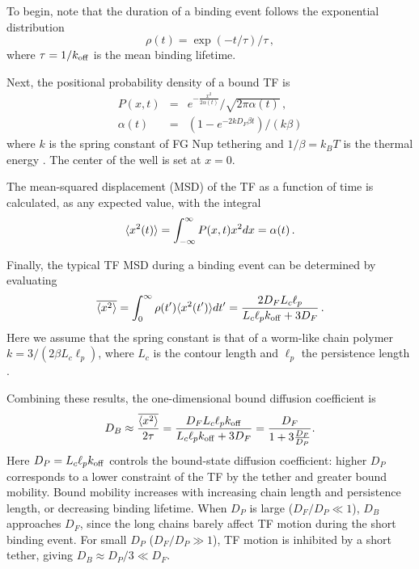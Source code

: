 To begin, note that the duration of a binding event follows the exponential distribution 
\begin{equation}
\rho (t) = \exp(-t/\tau)/\tau\,,
\end{equation}
where $\tau = 1/k_{\rm off}$ is the mean binding lifetime.

Next, the positional probability density of a bound TF is 
\begin{eqnarray}
P(x,t) &=& e^{-\frac{x^2}{2 \alpha(t)}}/\sqrt{2\pi \alpha(t)}\,,\\
\alpha(t) &=& (1-e^{-2kD_F\beta t})/(k\beta)
\end{eqnarray}
 where $k$ is the spring constant of FG Nup tethering and $1/\beta = k_BT$ is the thermal energy \cite{doi88}.  The center of the well is set at $x=0$.

The mean-squared displacement (MSD) of the TF as a function of time is calculated, as any expected value, with the integral
\begin{equation}
\langle x^2(t) \rangle = \int_{-\infty}^{\infty} P(x,t) x^2 dx = \alpha(t)\,.
\end{equation}

Finally, the typical TF MSD during a binding event can be determined by evaluating
\begin{equation}\label{eq:sho}
  \overline{\langle x^2 \rangle} = \int_0^{\infty} \rho(t') \langle x^2(t') \rangle dt' = \frac{2D_F L_c
    \ell_p}{L_c \ell_p k_{\rm off}+ 3D_F}\,. 
\end{equation} %
Here we assume that the spring constant is that of a worm-like chain polymer $k = 3/(2\beta L_c \ell_p)$, where $L_c$ is the contour length and $\ell_p$ the persistence length \cite{howard01}.

Combining these results, the one-dimensional bound diffusion coefficient is
\begin{equation}\label{eq:dbound}
  D_B \approx \frac{\overline{\langle x^2 \rangle}}{2\tau} = \frac{D_F L_c \ell_p
    k_{\mathrm{off}}}{L_c \ell_p k_{\mathrm{off}} + 3D_F} =
  \frac{D_F}{1+3\frac{D_F}{D_{P}}}.  
\end{equation}
Here $D_P = L_c \ell_p k_{\mathrm{off}}$ controls the bound-state diffusion coefficient: higher $D_P$ corresponds to a lower constraint of the TF by the tether and greater bound mobility. Bound mobility increases with increasing chain length and persistence length, or decreasing binding lifetime. When $D_P$ is large ($D_F/D_P\ll1$), $D_B$ approaches $D_F$, since the long chains barely affect TF motion during the short binding event. For small $D_P$ ($D_F/D_P\gg1$), TF motion is inhibited by a short tether, giving $D_B\approx D_P/3\ll D_F$.  

